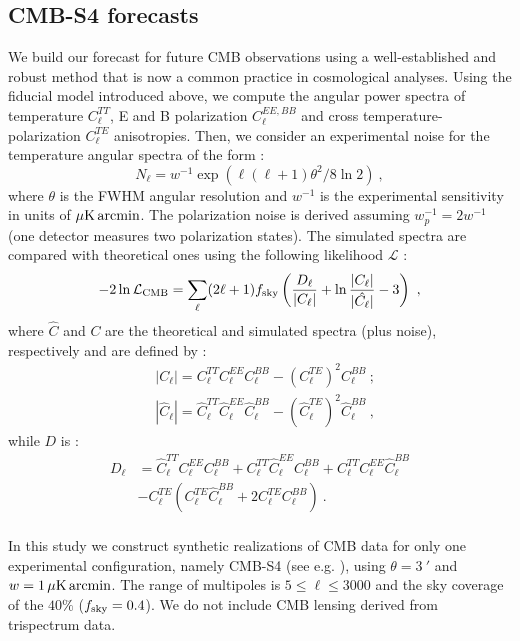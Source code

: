 \documentclass[fleqn,usenatbib,letters]{mnras}
\begin{document}
\subsection{CMB-S4 forecasts}
We build our forecast for future CMB observations using a well-established and robust method that is now a common practice in cosmological analyses. Using the fiducial model introduced above, we compute the angular power spectra of temperature $ C_\ell^{TT} $, E and B polarization $ C_\ell^{EE,BB} $ and cross temperature-polarization $C_\ell^{TE} $ anisotropies. Then, we consider an experimental noise for the temperature angular spectra of the form \citep{Perotto:2006rj}:
\begin{equation}
	N_\ell = w^{-1}\exp(\ell(\ell+1)\theta^2/8 \ln 2)~,
\end{equation}  
where $ \theta $ is the FWHM angular resolution and $ w^{-1} $ is the experimental sensitivity in units of $ \mu\mathrm{K}\,\rm arcmin $. The polarization noise is derived assuming $ w_p^{-1} = 2w^{-1} $ (one detector measures two polarization states). 
The simulated spectra are compared with theoretical ones using the following likelihood $\mathcal{L} $ \citep{Perotto:2006rj,Cabass:2015jwe}:
\begin{equation}
	-2\ln\mathcal{L}_{\rm CMB} = \sum_{\ell} (2\ell + 1)f_{\rm sky}\left(\frac{D_\ell}{|C_\ell|} + \ln\frac{|C_\ell|}{|\hat{C_\ell}|} - 3 \right)~,
\end{equation} 
where $\hat{C} $ and $ C $ are the theoretical and simulated spectra (plus noise), respectively and are defined by :
\begin{align}
&|C_\ell
| = C_\ell^{TT}C_\ell^{EE}C_\ell^{BB} -
\left(C_\ell^{TE}\right)^2C_\ell^{BB}~;  \\
&|\hat{C}_\ell| = \hat{C}_\ell^{TT}\hat{C}_\ell^{EE}\hat{C}_\ell^{BB} -
\left(\hat{C}_\ell^{TE}\right)^2\hat{C}_\ell^{BB}~,
\end{align}
while $ D $ is :
\begin{align}
	D_\ell  &=
	\hat{C}_\ell^{TT}C_\ell^{EE}C_\ell^{BB} +
	C_\ell^{TT}\hat{C}_\ell^{EE}C_\ell^{BB} +
	C_\ell^{TT}C_\ell^{EE}\hat{C}_\ell^{BB} \nonumber\\
	&- C_\ell^{TE}\left(C_\ell^{TE}\hat{C}_\ell^{BB} +
	2C_\ell^{TE}C_\ell^{BB} \right)~. \nonumber\\
\end{align}

In this study we construct synthetic realizations of CMB data for only one experimental configuration, namely CMB-S4 (see e.g. \citep{Abazajian:2016yjj}), using $ \theta = \SI{3}{\arcminute} $ and $ w = 1\, \si{\mu\kelvin}\,\rm arcmin $. The range of multipoles  is $ 5 \leq \ell \leq 3000 $ and the sky coverage of the $ 40\% $ ($f_{\rm sky} = 0.4$). We do not include CMB lensing derived from trispectrum data.
\end{document}
